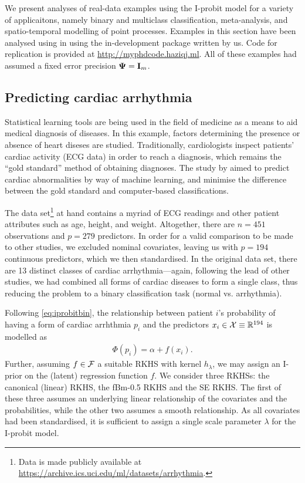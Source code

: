 \documentclass[showframe,11pt]{report}\usepackage[]{graphicx}\usepackage{xcolor}
\begin{document}
We present analyses of real-data examples using the I-probit model for a variety of applicaitons, namely binary and multiclass classification, meta-analysis, and spatio-temporal modelling of point processes.
Examples in this section have been analysed using in  using the in-development  package written by us.
Code for replication is provided at \url{http://myphdcode.haziqj.ml}.
All of these examples had assumed a fixed error precision ${\bm\Psi} = {\mathbf I}_m$.

\subsection{Predicting cardiac arrhythmia}

Statistical learning tools are being used in the field of medicine as a means to aid medical diagnosis of diseases.
In this example, factors determining the presence or absence of heart diseses are studied.
Traditionally, cardiologists inspect patients' cardiac activity (ECG data) in order to reach a diagnosis, which remains the ``gold standard'' method of obtaining diagnoses.
The study by \citet{guvenir1997supervised} aimed to predict cardiac abnormalities by way of machine learning, and minimise the difference between the gold standard and computer-based classifications.

The data set\footnote{Data is made publicly available at \url{https://archive.ics.uci.edu/ml/datasets/arrhythmia}.} at hand contains a myriad of ECG readings and other patient attributes such as age, height, and weight.
Altogether, there are $n=451$ observations and $p=279$ predictors.
In order for a valid comparison to be made to other studies, we excluded nominal covariates, leaving us with $p=194$ continuous predictors, which we then standardised.
In the original data set, there are 13 distinct classes of cardiac arrhythmia---again, following the lead of other studies, we had combined all forms of cardiac diseases to form a single class, thus reducing the problem to a binary classification task (normal vs. arrhythmia).

Following \cref{eq:iprobitbin}, the relationship between patient $i$'s probability of having a form of cardiac arrhthmia $p_i$ and the predictors $x_i\in{\mathcal X} \equiv \mathbb{R}^{194}$ is modelled as
\begin{gather*}
  \Phi(p_i) = \alpha + f(x_i).
\end{gather*}
Further, assuming $f\in{\mathcal F}$ a suitable RKHS with kernel $h_\lambda$, we may assign an I-prior on the (latent) regression function $f$.
We consider three RKHSs: the canonical (linear) RKHS, the fBm-0.5 RKHS and the SE RKHS.
The first of these three assumes an underlying linear relationship of the covariates and the probabilities, while the other two assumes a smooth relationship.
As all covariates had been standardised, it is sufficient to assign a single scale parameter $\lambda$ for the I-probit model.
\end{document}
